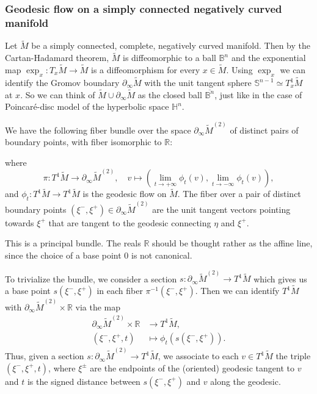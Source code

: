 \documentclass{report}
\begin{document}
\subsubsection{Geodesic flow on a simply connected negatively curved manifold}
Let $\tilde M$ be a simply connected, complete, negatively curved manifold.
Then by the Cartan-Hadamard theorem, $\tilde M$ is diffeomorphic to a ball $\mathbb B^n$ and the exponential map $\exp_x: T_x \tilde M \to \tilde M$ is a diffeomorphism for every $x \in \tilde M$.
Using $\exp_x$ we can identify the Gromov boundary $\partial_\infty \tilde M$ with the unit tangent sphere $\mathbb S^{n-1} \simeq T_x^1 \tilde M$ at $x$.
So we can think of $\tilde M \cup \partial_\infty \tilde M$ as the closed ball $\overline{\mathbb B^n}$, just like in the case of Poincaré-disc model of the hyperbolic space $\mathbb H^n$.

We have the following fiber bundle over the space $\partial_\infty \tilde M^{(2)}$ of distinct pairs of boundary points, with fiber isomorphic to $\mathbb R$:

\begin{center}
\end{center}
where 
\[
\pi: T^1 \tilde M \to \partial_\infty \tilde M^{(2)}, \quad v \mapsto \left(\lim_{t \to +\infty} \phi_t(v), \lim_{t \to -\infty} \phi_t(v)\right),
\]
and $\phi_t: T^1 \tilde M \to T^1 \tilde M$ is the geodesic flow on $\tilde M$. The fiber over a pair of distinct boundary points $(\xi^-, \xi^+) \in \partial_\infty \tilde M^{(2)}$ are the unit tangent vectors pointing towards $\xi^+$ that are tangent to the geodesic connecting $\eta$ and $\xi^+$.

This is a principal bundle. 
The reals $\mathbb R$ should be thought rather as the affine line, since the choice of a base point $0$ is not canonical.

To trivialize the bundle, we consider a section $s: \partial_\infty \tilde M^{(2)} \to T^1 \tilde M$ which gives us a base point $s(\xi^-, \xi^+)$ in each fiber $\pi^{-1}(\xi^-, \xi^+)$.
Then we can identify $T^1 \tilde M$ with $\partial_\infty \tilde M^{(2)} \times \mathbb R$ via the map
\begin{align*}
    \partial_\infty \tilde M^{(2)} \times \mathbb R &\to T^1 \tilde M,\\
    (\xi^-, \xi^+, t) &\mapsto \phi_t(s(\xi^-, \xi^+)).
\end{align*}
Thus, given a section $s: \partial_\infty \tilde M^{(2)} \to T^1 \tilde M$, we associate to each $v \in T^1 \tilde M$ the triple $(\xi^-, \xi^+, t)$, where $\xi^\pm$ are the endpoints of the (oriented) geodesic tangent to $v$ and $t$ is the signed distance between $s(\xi^-, \xi^+)$ and $v$ along the geodesic.
\end{document}
